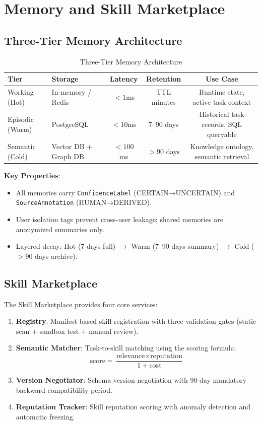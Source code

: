 \documentclass[11pt,a4paper]{article}
\begin{document}
\section{Memory and Skill Marketplace}
\label{sec:memory}

\subsection{Three-Tier Memory Architecture}

\begin{table}[ht]
\centering
\caption{Three-Tier Memory Architecture}
\label{tab:memory}
\begin{tabular}{lp{2.5cm}ccc}
\toprule
Tier & Storage & Latency & Retention & Use Case \\
\midrule
Working (Hot) & In-memory / Redis & $<1$ms & TTL minutes & Runtime state, active task context \\
Episodic (Warm) & PostgreSQL & $<10$ms & 7--90 days & Historical task records, SQL queryable \\
Semantic (Cold) & Vector DB + Graph DB & $<100$ms & $>90$ days & Knowledge ontology, semantic retrieval \\
\bottomrule
\end{tabular}
\end{table}

\textbf{Key Properties}:
\begin{itemize}
  \item All memories carry \texttt{ConfidenceLabel} (CERTAIN→UNCERTAIN) and \texttt{SourceAnnotation} (HUMAN→DERIVED).
  \item User isolation tags prevent cross-user leakage; shared memories are anonymized summaries only.
  \item Layered decay: Hot (7 days full) $\rightarrow$ Warm (7--90 days summary) $\rightarrow$ Cold ($>90$ days archive).
\end{itemize}

\subsection{Skill Marketplace}

The Skill Marketplace provides four core services:

\begin{enumerate}
  \item \textbf{Registry}: Manifest-based skill registration with three validation gates (static scan + sandbox test + manual review).
  \item \textbf{Semantic Matcher}: Task-to-skill matching using the scoring formula:
    \[
    \text{score} = \frac{\text{relevance} \times \text{reputation}}{1 + \text{cost}}
    \]
  \item \textbf{Version Negotiator}: Schema version negotiation with 90-day mandatory backward compatibility period.
  \item \textbf{Reputation Tracker}: Skill reputation scoring with anomaly detection and automatic freezing.
\end{enumerate}
\end{document}
